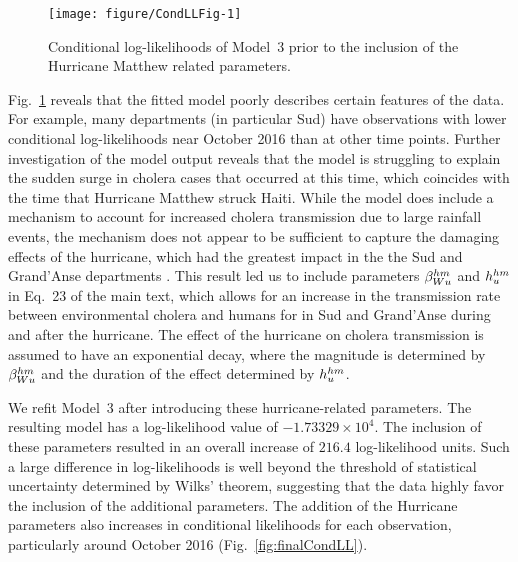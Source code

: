 \begin{figure}[!ht]
\begin{knitrout}
\color{fgcolor}
\texttt{[image: figure/CondLLFig-1]} 
\end{knitrout}
\caption[Conditional log-likelihoods without hurricane adjustment]{\label{fig:condLL}Conditional log-likelihoods of Model~3 prior to the inclusion of the Hurricane Matthew related parameters.}
\end{figure}

Fig.~\ref{fig:condLL} reveals that the fitted model poorly describes certain features of the data.
For example, many departments (in particular Sud) have observations with lower conditional log-likelihoods near October 2016 than at other time points.
Further investigation of the model output reveals that the model is struggling to explain the sudden surge in cholera cases that occurred at this time, which coincides with the time that Hurricane Matthew struck Haiti.
While the model does include a mechanism to account for increased cholera transmission due to large rainfall events, the mechanism does not appear to be sufficient to capture the damaging effects of the hurricane, which had the greatest impact in the the Sud and Grand'Anse departments \cite{ferreirai16}.
This result led us to include parameters $\beta_{Wu}^{hm}$ and $h_{u}^{hm}$ in Eq.~23 of the main text, which allows for an increase in the transmission rate between environmental cholera and humans for in Sud and Grand'Anse during and after the hurricane.
The effect of the hurricane on cholera transmission is assumed to have an exponential decay, where the magnitude is determined by $\beta_{Wu}^{hm}$ and the duration of the effect determined by $h_{u}^{hm}$.



We refit Model~3 after introducing these hurricane-related parameters.
The resulting model has a log-likelihood value of $\ensuremath{-1.73329\times 10^{4}}$.
The inclusion of these parameters resulted in an overall increase of $216.4$ log-likelihood units.
Such a large difference in log-likelihoods is well beyond the threshold of statistical uncertainty determined by Wilks' theorem, suggesting that the data highly favor the inclusion of the additional parameters.
The addition of the Hurricane parameters also increases in conditional likelihoods for each observation, particularly around October 2016 (Fig.~\ref{fig:finalCondLL}).



